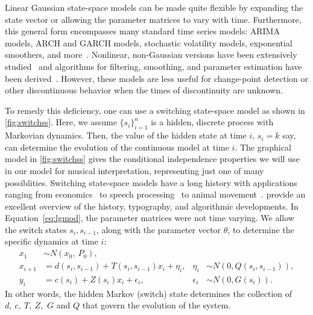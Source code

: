 \documentclass[aoas]{imsart}
\begin{document}
Linear Gaussian state-space models can be made quite flexible
by expanding the state vector or allowing the parameter matrices to
vary with time. Furthermore, this general form encompasses many
standard time series models: ARIMA models, ARCH and GARCH models,
stochastic volatility models, exponential smoothers, and
more~\citep[see][for many other
examples]{DurbinKoopman2001}. Nonlinear, non-Gaussian versions have
been extensively
studied~\citep{DurbinKoopman1997,Fuh2006,Kitagawa1987,Kitagawa1996}
and algorithms for filtering, smoothing, and parameter estimation have
been derived~\citep[for example,][]{KoyamaPerez-Bolde2010,AndrieuDoucet2010}. 
However, these models are less useful
for change-point detection or other discontinuous behavior
when the times of discontinuity are unknown. 

To remedy this deficiency, one can use a switching state-space
model as shown in \autoref{fig:switchss}. Here, we assume $\{s_i\}_{i=1}^n$ is a
hidden, discrete process with Markovian dynamics. Then, the value of
the hidden state at time $i$, $s_i=k$ say, can determine the evolution of
the continuous model at time $i$. The graphical model in
\autoref{fig:switchss} gives the conditional independence properties
we will use in our model for musical interpretation, 
representing just one of many possiblities. Switching state-space models have a long
history with applications ranging from
economics~\citep{KimNelson1998,Kim1994,Hamilton2011} to speech
processing~\citep{FoxSudderth2011} to animal
movement~\citep{PattersonThomas2008,BlockJonsen2011}. \citet{GhahramaniHinton2000}
provide an excellent overview of the history, 
typography, and algorithmic developments. In Equation~\eqref{eq:lgmod}, the
parameter matrices were not time varying. We
allow the switch states $s_i, s_{i-1}$, along with the parameter
vector $\theta$, to determine the specific dynamics at time $i$:
\begin{equation}
  \begin{aligned}
    x_1 &\sim N(x_0,\ P_0),\\
    x_{i+1}&= d(s_i,s_{i-1})+T(s_i,s_{i-1}) x_i + \eta_i, 
    & \eta_i &\sim N(0,Q(s_i,s_{i-1})),\\
    y_i&= c(s_i) + Z(s_i) x_i + \epsilon_i, & \epsilon_i &\sim N(0, G(s_i)).
  \end{aligned}
\end{equation}
In other words, the hidden Markov (switch) state determines the
collection of $d,\ c,\ T,\ Z,$ $G$ and $Q$
that govern the evolution of the system. 
\end{document}
